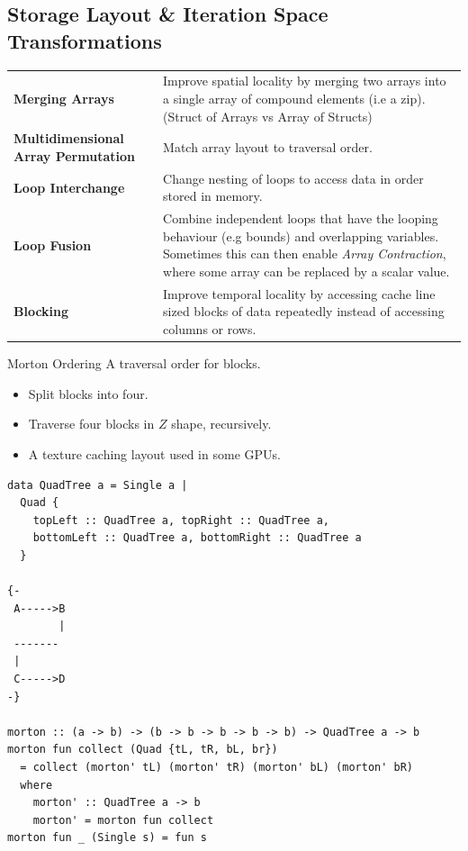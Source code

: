 \subsection{Storage Layout \& Iteration Space Transformations}
\begin{center}
	\begin{tabular}{l p{}}
		\textbf{Merging Arrays}                     & Improve spatial locality by merging two arrays into a single array of compound elements (i.e a zip). (Struct of Arrays vs Array of Structs)                                                                      \\
		\textbf{Multidimensional Array Permutation} & Match array layout to traversal order.                                                                                                                                                                           \\
		\textbf{Loop Interchange}                   & Change nesting of loops to access data in order stored in memory.                                                                                                                                                \\
		\textbf{Loop Fusion}                        & Combine independent loops that have the looping behaviour (e.g bounds) and overlapping variables. Sometimes this can then enable \textit{Array Contraction}, where some array can be replaced by a scalar value. \\
		\textbf{Blocking}                           & Improve temporal locality by accessing cache line sized blocks of data repeatedly instead of accessing columns or rows.                                                                                          \\
	\end{tabular}
\end{center}

\begin{definitionbox}{Morton Ordering}
	A traversal order for blocks.
	\begin{itemize}
		\item Split blocks into four.
		\item Traverse four blocks in $Z$ shape, recursively.
		\item A texture caching layout used in some GPUs.
	\end{itemize}
	\begin{verbatim}
data QuadTree a = Single a | 
  Quad { 
    topLeft :: QuadTree a, topRight :: QuadTree a, 
    bottomLeft :: QuadTree a, bottomRight :: QuadTree a
  }

{-
 A----->B
        |
 -------
 |
 C----->D
-}

morton :: (a -> b) -> (b -> b -> b -> b -> b) -> QuadTree a -> b
morton fun collect (Quad {tL, tR, bL, br}) 
  = collect (morton' tL) (morton' tR) (morton' bL) (morton' bR) 
  where
    morton' :: QuadTree a -> b
    morton' = morton fun collect
morton fun _ (Single s) = fun s
    \end{verbatim}
\end{definitionbox}

